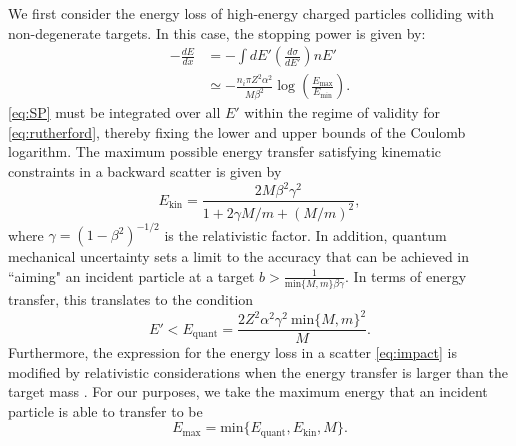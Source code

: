 \documentclass[twocolumn,showpacs,preprintnumbers,amsmath,amssymb,prd]{revtex4}
\def\r{\right)}
\def\l{\left(}
\begin{document}
\begin{appendices}
We first consider the energy loss of high-energy charged particles colliding with non-degenerate targets. In this case, the stopping power is given by:
\begin{align}
\label{eq:SP}
-\frac{dE}{dx} & = - \int dE' \left(\frac{d \sigma}{dE'}\right) n E' \\
& \simeq -\frac{n_i \pi Z^2 \alpha^2}{M \beta^2} \log {\l\frac{E_{\text{max}}}{E_{\text{min}}}\r}.
\end{align}
\eqref{eq:SP} must be integrated over all $E'$ within the regime of validity for \eqref{eq:rutherford}, thereby fixing the lower and upper bounds of the Coulomb logarithm. The maximum possible energy transfer satisfying kinematic constraints in a backward scatter is given by
\begin{equation}
E_{\text{kin}} = \frac{2 M \beta^2 \gamma^2}{1+ 2\gamma M/m +(M/m)^2},
\end{equation}
where $\gamma = (1-\beta^2)^{-1/2}$ is the relativistic factor. In addition, quantum mechanical uncertainty sets a limit to the accuracy that can be achieved in ``aiming" an incident particle at a target $b > \frac{1}{\text{min}\{{M, m}\} \beta \gamma}$. In terms of energy transfer, this translates to the condition
\begin{equation}
E' < E_\text{quant} = \frac{2 Z^2 \alpha^2 \gamma^2 ~\text{min}\{{M, m}\}^2}{M}.
\end{equation}
Furthermore, the expression for the energy loss in a scatter \eqref{eq:impact} is modified by relativistic considerations when the energy transfer is larger than the target mass \cite{Rossi}. For our purposes, we take the maximum energy that an incident particle is able to transfer to be
\begin{equation}
E_{\text{max}} = \text{min}\{E_\text{quant}, E_{\text{kin}}, M\}.
\end{equation}


\end{appendices}
\end{document}
